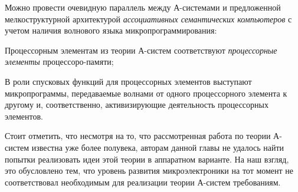 \begin{textitemize}
	Можно провести очевидную параллель между А-системами и предложенной мелкоструктурной архитектурой \textit{ассоциативных семантических компьютеров} с учетом наличия волнового языка микропрограммирования:
	\begin{textitemize}
		\item Процессорным элементам из теории А-систем соответствуют \textit{процессорные элементы} процессоро-памяти;
		\item В роли спусковых функций для процессорных элементов выступают микропрограммы, передаваемые волнами от одного процессорного элемента к другому и, соответственно, активизирующие деятельность процессорных элементов.
	\end{textitemize}

	Стоит отметить, что несмотря на то, что рассмотренная работа по теории А-систем известна уже более полувека, авторам данной главы не удалось найти попытки реализовать идеи этой теории в аппаратном варианте. На наш взгляд, это обусловлено тем, что уровень развития микроэлектроники на тот момент не соответствовал необходимым для реализации теории А-систем требованиям.
\end{textitemize}

